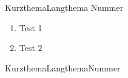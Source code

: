 \documentclass[11pt, a4paper,twoside]{article}
\author{Tobias Frischholz}
\begin{document}
\sffamily
\begin{arbeitsblatt}[06.04.2015]{Kurzthema}{Langthema}
{Nummer}

\begin{enumerate}
	\item{Test 1}
	\item{Test 2}
\end{enumerate}

\end{arbeitsblatt}

\begin{arbeitsblattloesung}[06.04.2015]{Kurzthema}{Langthema}{Nummer}

\end{arbeitsblattloesung}
\end{document}
